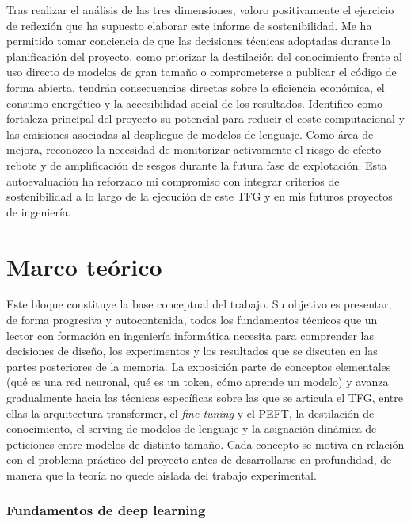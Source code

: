 \documentclass[11pt,a4paper]{article}
\begin{document}
Tras realizar el análisis de las tres dimensiones, valoro positivamente el ejercicio de reflexión que ha supuesto elaborar este informe de sostenibilidad. Me ha permitido tomar conciencia de que las decisiones técnicas adoptadas durante la planificación del proyecto, como priorizar la destilación del conocimiento frente al uso directo de modelos de gran tamaño o comprometerse a publicar el código de forma abierta, tendrán consecuencias directas sobre la eficiencia económica, el consumo energético y la accesibilidad social de los resultados. Identifico como fortaleza principal del proyecto su potencial para reducir el coste computacional y las emisiones asociadas al despliegue de modelos de lenguaje. Como área de mejora, reconozco la necesidad de monitorizar activamente el riesgo de efecto rebote y de amplificación de sesgos durante la futura fase de explotación. Esta autoevaluación ha reforzado mi compromiso con integrar criterios de sostenibilidad a lo largo de la ejecución de este TFG y en mis futuros proyectos de ingeniería.

\part{Marco teórico}
\label{part:marco-teorico}

Este bloque constituye la base conceptual del trabajo. Su objetivo es presentar, de forma progresiva y autocontenida, todos los fundamentos técnicos que un lector con formación en ingeniería informática necesita para comprender las decisiones de diseño, los experimentos y los resultados que se discuten en las partes posteriores de la memoria. La exposición parte de conceptos elementales (qué es una red neuronal, qué es un token, cómo aprende un modelo) y avanza gradualmente hacia las técnicas específicas sobre las que se articula el TFG, entre ellas la arquitectura transformer, el \textit{fine-tuning} y el PEFT, la destilación de conocimiento, el serving de modelos de lenguaje y la asignación dinámica de peticiones entre modelos de distinto tamaño. Cada concepto se motiva en relación con el problema práctico del proyecto antes de desarrollarse en profundidad, de manera que la teoría no quede aislada del trabajo experimental.

\section{Fundamentos de deep learning}
\label{sec:fundamentos}
\end{document}
